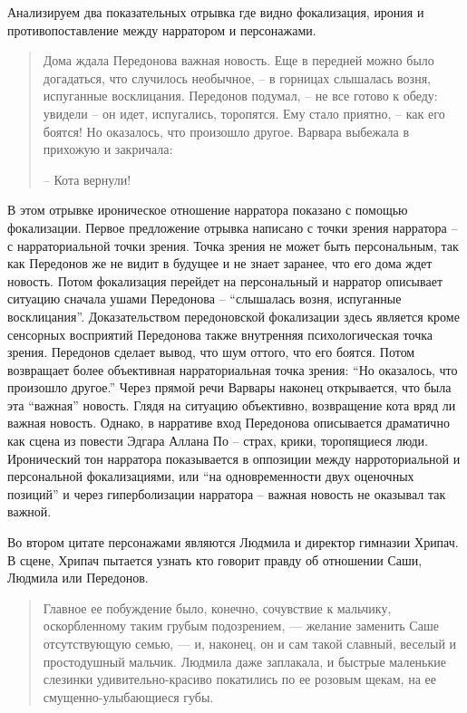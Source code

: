 \documentclass[12pt,a4paper]{article}
\begin{document}
Анализируем два показательных отрывка где видно фокализация, ирония и противопоставление между нарратором и персонажами.

\begin{quote}
Дома ждала Передонова важная новость. Еще в передней можно
было догадаться, что случилось необычное, – в горницах слышалась 
возня, испуганные восклицания. Передонов подумал, – не все
готово к обеду: увидели – он идет, испугались, торопятся. Ему стало
приятно, – как его боятся! Но оказалось, что произошло другое. 
Варвара выбежала в прихожую и закричала:

– Кота вернули!

\parencite[171.]{sologub2004}

\end{quote}

В этом отрывке ироническое отношение нарратора показано с помощью фокализации. Первое предложение отрывка написано с точки зрения нарратора – с нарраториальной точки зрения. Точка зрения не может быть персональным, так как Передонов же не видит в будущее и не знает заранее, что его дома ждет новость. Потом фокализация перейдет на персональный и нарратор описывает ситуацию сначала ушами Передонова – \enquote{слышалась 
возня, испуганные восклицания}. Доказательством передоновской фокализации здесь является кроме сенсорных восприятий Передонова также внутренняя психологическая точка зрения. Передонов сделает вывод, что шум оттого, что его боятся. Потом возвращает более объективная нарраториальная точка зрения: \enquote{Но оказалось, что произошло другое.} Через прямой речи Варвары наконец открывается, что была эта \enquote{важная} новость.
Глядя на ситуацию объективно, возвращение кота вряд ли важная новость. Однако, в нарративе вход Передонова описывается драматично как сцена из повести Эдгара Аллана По – страх, крики, торопящиеся люди. Иронический тон нарратора показывается  в оппозиции между нарроториальной и персональной фокализациями, или \enquote{на одновременности двух оценочных позиций} и через гиперболизации нарратора – важная новость не оказывал так важной. 

Во втором цитате персонажами являются Людмила и директор гимназии Хрипач. В сцене, Хрипач пытается узнать кто говорит правду об отношении Саши, Людмила или Передонов. 

\begin{quote}
Главное ее побуждение было,
конечно, сочувствие к мальчику, оскорбленному таким грубым 
подозрением, — желание заменить Саше отсутствующую семью, — и, 
наконец, он и сам такой славный, веселый и простодушный мальчик. 
Людмила даже заплакала, и быстрые маленькие слезинки 
удивительно-красиво покатились по ее розовым щекам, на ее смущенно-улыбающиеся
губы. 

\parencite[239]{sologub2004}
\end{quote}
\end{document}
